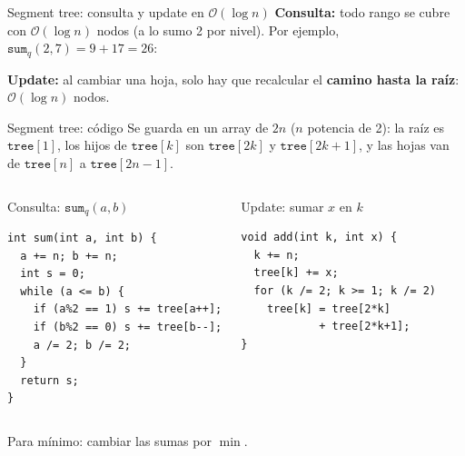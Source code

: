 \documentclass{beamer}
\begin{document}
\begin{frame}{Segment tree: consulta y update en $\mathcal{O}(\log n)$}
    \textbf{Consulta:} todo rango se cubre con $\mathcal{O}(\log n)$ nodos
    (a lo sumo 2 por nivel). Por ejemplo, $\texttt{sum}_q(2,7) = 9 + 17 = 26$:
    \begin{center}
    \end{center}

    \textbf{Update:} al cambiar una hoja, solo hay que recalcular el
    \textbf{camino hasta la raíz}: $\mathcal{O}(\log n)$ nodos.
\end{frame}


\begin{frame}[fragile]{Segment tree: código}
    Se guarda en un array de $2n$ ($n$ potencia de 2): la raíz es
    $\texttt{tree}[1]$, los hijos de $\texttt{tree}[k]$ son $\texttt{tree}[2k]$
    y $\texttt{tree}[2k{+}1]$, y las hojas van de $\texttt{tree}[n]$ a
    $\texttt{tree}[2n{-}1]$.
    \begin{columns}[t]
        \begin{block}{Consulta: $\texttt{sum}_q(a,b)$}
        \footnotesize
\begin{verbatim}
int sum(int a, int b) {
  a += n; b += n;
  int s = 0;
  while (a <= b) {
    if (a%2 == 1) s += tree[a++];
    if (b%2 == 0) s += tree[b--];
    a /= 2; b /= 2;
  }
  return s;
}
\end{verbatim}
        \end{block}
        \begin{block}{Update: sumar $x$ en $k$}
        \footnotesize
\begin{verbatim}
void add(int k, int x) {
  k += n;
  tree[k] += x;
  for (k /= 2; k >= 1; k /= 2)
    tree[k] = tree[2*k]
            + tree[2*k+1];
}
\end{verbatim}
        \end{block}
    \end{columns}

    \vspace{0.1cm}
    Para mínimo: cambiar las sumas por $\min$.
\end{frame}
\end{document}
